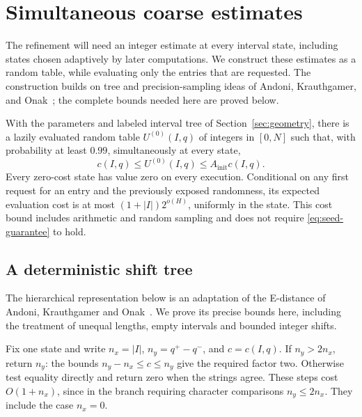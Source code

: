 \section{Simultaneous coarse estimates}\label{sec:seed}

The refinement will need an integer estimate at every interval state, including
states chosen adaptively by later computations.  We construct these estimates
as a random table, while evaluating only the entries that are requested.  The
construction builds on tree and precision-sampling ideas of Andoni,
Krauthgamer, and Onak~\cite{AndoniKrauthgamerOnak2010}; the complete bounds
needed here are proved below.

\begin{theorem}\label{thm:seed}
With the parameters and labeled interval tree of Section~\ref{sec:geometry},
there is a lazily evaluated random table $U^{(0)}(I,q)$ of integers in $[0,N]$
such that, with probability at least $0.99$, simultaneously at every state,
\begin{equation}\label{eq:seed-guarantee}
 c(I,q)\le U^{(0)}(I,q)\le A_{\mathrm{init}}c(I,q).
\end{equation}
Every zero-cost state has value zero on every execution.  Conditional on any
first request for an entry and the previously exposed randomness, its expected
evaluation cost is at most $(1+|I|)2^{o(H)}$, uniformly in the state.  This cost
bound includes arithmetic and random sampling and does not require
\eqref{eq:seed-guarantee} to hold.
\end{theorem}

\subsection{A deterministic shift tree}

The hierarchical representation below is an adaptation of the
E-distance of Andoni, Krauthgamer and Onak~\cite[Definition~3.2 and
Theorem~3.3]{AndoniKrauthgamerOnak2010}. We prove its precise bounds here,
including the treatment of unequal lengths, empty intervals and bounded
integer shifts.

Fix one state and write $n_x=|I|$, $n_y=q^+-q^-$, and $c=c(I,q)$.  If
$n_y>2n_x$, return $n_y$: the bounds $n_y-n_x\le c\le n_y$ give the required
factor two.  Otherwise
test equality directly and return zero when the strings agree.  These steps
cost $O(1+n_x)$, since in the branch requiring character comparisons
$n_y\le2n_x$.  They include the case $n_x=0$.

